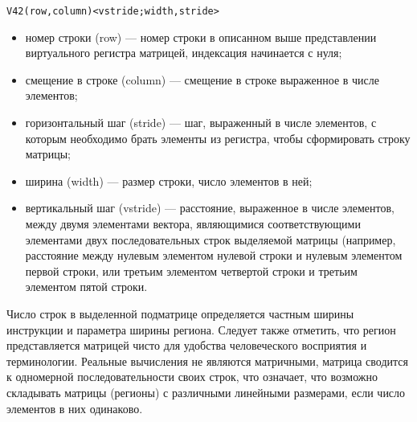 \begin{lstlisting}[caption=Пример базового векторного входного операнда, captionpos=b]
    V42(row,column)<vstride;width,stride>
\end{lstlisting}

\begin{itemize}
    \item номер строки (row) --- номер строки в описанном выше представлении виртуального регистра матрицей, индексация начинается с нуля;
    \item смещение в строке (column) --- смещение в строке выраженное в числе элементов;
    \item горизонтальный шаг (stride) --- шаг, выраженный в числе элементов, с которым необходимо брать элементы из регистра, чтобы сформировать строку матрицы;
    \item ширина (width) --- размер строки, число элементов в ней;
    \item вертикальный шаг (vstride) --- расстояние, выраженное в числе элементов, между двумя элементами вектора, являющимися соответствующими элементами двух последовательных строк выделяемой матрицы (например, расстояние между нулевым элементом нулевой строки и нулевым элементом первой строки, или третьим элементом четвертой строки и третьим элементом пятой строки.
\end{itemize}

Число строк в выделенной подматрице определяется частным ширины инструкции и параметра ширины региона.
Следует также отметить, что регион представляется матрицей чисто для удобства человеческого восприятия и терминологии. Реальные вычисления не являются матричными, матрица сводится к одномерной последовательности своих строк, что означает, что возможно складывать матрицы (регионы) с различными линейными размерами, если число элементов в них одинаково.

